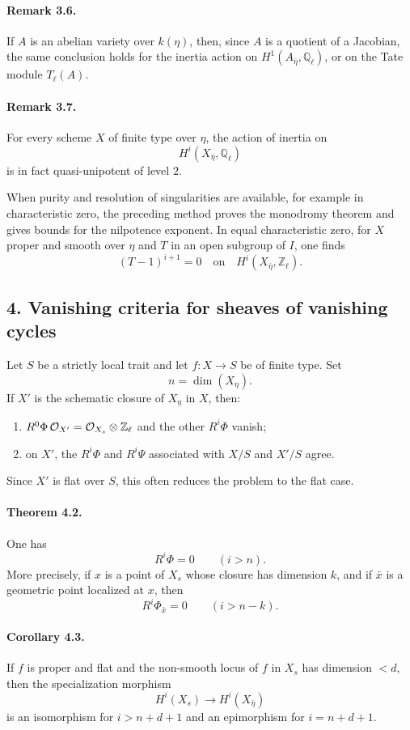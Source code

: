 \documentclass[11pt]{article}
\theoremstyle{plain}
\theoremstyle{definition}
\theoremstyle{remark}
\newcommand{\QQ}{\mathbb Q}
\newcommand{\ZZ}{\mathbb Z}
\newcommand{\longto}{\longrightarrow}
\begin{document}
\paragraph{Remark 3.6.}
If $A$ is an abelian variety over $k(\eta)$, then, since $A$ is a quotient of a Jacobian, the same conclusion holds for the inertia action on $H^1(A_{\bar\eta},\QQ_\ell)$, or on the Tate module $T_\ell(A)$.

\paragraph{Remark 3.7.}
For every scheme $X$ of finite type over $\eta$, the action of inertia on
\[
H^i(X_{\bar\eta},\QQ_\ell)
\]
is in fact quasi-unipotent of level $2$.

When purity and resolution of singularities are available, for example in characteristic zero, the preceding method proves the monodromy theorem and gives bounds for the nilpotence exponent. In equal characteristic zero, for $X$ proper and smooth over $\eta$ and $T$ in an open subgroup of $I$, one finds
\[
(T-1)^{i+1}=0
\quad\text{on}\quad
H^i(X_{\bar\eta},\ZZ_\ell).
\]

\subsection*{4. Vanishing criteria for sheaves of vanishing cycles}

Let $S$ be a strictly local trait and let $f:X\to S$ be of finite type. Set
\[
n=\dim(X_\eta).
\]
If $X'$ is the schematic closure of $X_\eta$ in $X$, then:
\begin{enumerate}[label=\alph*)]
\item $R^0\Phi\,\cO_{X'}=\cO_{X_s}\otimes\ZZ_\ell$ and the other $R^i\Phi$ vanish;
\item on $X'$, the $R^i\Phi$ and $R^i\Psi$ associated with $X/S$ and $X'/S$ agree.
\end{enumerate}
Since $X'$ is flat over $S$, this often reduces the problem to the flat case.

\paragraph{Theorem 4.2.}
One has
\[
R^i\Phi=0\qquad (i>n).
\]
More precisely, if $x$ is a point of $X_s$ whose closure has dimension $k$, and if $\bar x$ is a geometric point localized at $x$, then
\[
R^i\Phi_{\bar x}=0\qquad (i>n-k).
\]

\paragraph{Corollary 4.3.}
If $f$ is proper and flat and the non-smooth locus of $f$ in $X_s$ has dimension $<d$, then the specialization morphism
\[
H^i(X_s)\longto H^i(X_{\bar\eta})
\]
is an isomorphism for $i>n+d+1$ and an epimorphism for $i=n+d+1$.
\end{document}
